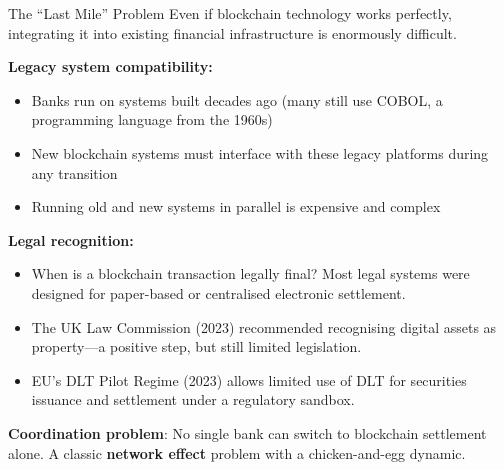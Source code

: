 \documentclass[10pt]{beamer}
\newcommand{\highlight}[1]{\textcolor{AccentOrange}{\textbf{#1}}}
\begin{document}
\begin{frame}{The ``Last Mile'' Problem}
  Even if blockchain technology works perfectly, integrating it into existing financial infrastructure is enormously difficult.
  
  \vspace{0.5em}
  \textbf{Legacy system compatibility:}
  \begin{itemize}
    \item Banks run on systems built decades ago (many still use COBOL, a programming language from the 1960s)
    \item New blockchain systems must interface with these legacy platforms during any transition
    \item Running old and new systems in parallel is expensive and complex
  \end{itemize}
  
  \vspace{0.5em}
  \textbf{Legal recognition:}
  \begin{itemize}
    \item When is a blockchain transaction legally final? Most legal systems were designed for paper-based or centralised electronic settlement.
    \item The UK Law Commission (2023) recommended recognising digital assets as property---a positive step, but still limited legislation.
    \item EU's DLT Pilot Regime (2023) allows limited use of DLT for securities issuance and settlement under a regulatory sandbox.
  \end{itemize}
  
  \vspace{0.3em}
  \textbf{Coordination problem}: No single bank can switch to blockchain settlement alone. A classic \highlight{network effect} problem with a chicken-and-egg dynamic.
\end{frame}
\end{document}
